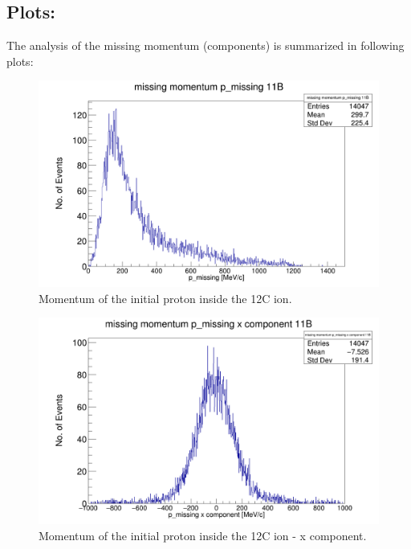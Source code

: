 \documentclass{report}
\begin{document}
\subsection{Plots:}
The analysis of the missing momentum (components) is summarized in following plots:\newline
\begin{figure}[!htb]
  \includegraphics[width=\linewidth]{missing_mom_11B.png}
  \caption{Momentum of the initial proton inside the 12C ion.}
\end{figure}
\begin{figure}[!htb]
  \includegraphics[width=\linewidth]{missing_mom_11B_x_comp.png}
  \caption{Momentum of the initial proton inside the 12C ion - x component.}
\end{figure}
\end{document}
